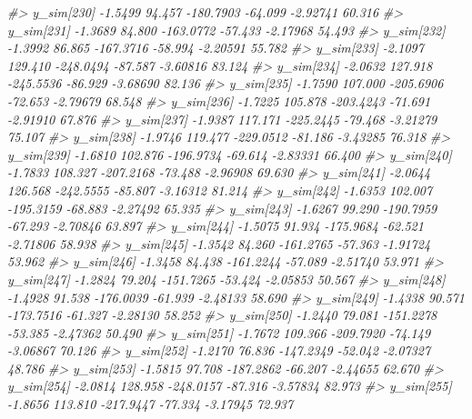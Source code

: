 \documentclass[
  10pt,
  italian,
  a4paper,
  extrafontsizes,onecolumn,openright
  ]{memoir}
\newenvironment{Shaded}{\begin{snugshade}}{\end{snugshade}}
\newcommand{\CommentTok}[1]{\textcolor[rgb]{0.56,0.35,0.01}{\textit{#1}}}
\begin{document}
\begin{Shaded}
\begin{Highlighting}[]
\CommentTok{\#\textgreater{}   y\_sim[230] {-}1.5499  94.457 {-}180.7903 {-}64.099 {-}2.92741 60.316}
\CommentTok{\#\textgreater{}   y\_sim[231] {-}1.3689  84.800 {-}163.0772 {-}57.433 {-}2.17968 54.493}
\CommentTok{\#\textgreater{}   y\_sim[232] {-}1.3992  86.865 {-}167.3716 {-}58.994 {-}2.20591 55.782}
\CommentTok{\#\textgreater{}   y\_sim[233] {-}2.1097 129.410 {-}248.0494 {-}87.587 {-}3.60816 83.124}
\CommentTok{\#\textgreater{}   y\_sim[234] {-}2.0632 127.918 {-}245.5536 {-}86.929 {-}3.68690 82.136}
\CommentTok{\#\textgreater{}   y\_sim[235] {-}1.7590 107.000 {-}205.6906 {-}72.653 {-}2.79679 68.548}
\CommentTok{\#\textgreater{}   y\_sim[236] {-}1.7225 105.878 {-}203.4243 {-}71.691 {-}2.91910 67.876}
\CommentTok{\#\textgreater{}   y\_sim[237] {-}1.9387 117.171 {-}225.2445 {-}79.468 {-}3.21279 75.107}
\CommentTok{\#\textgreater{}   y\_sim[238] {-}1.9746 119.477 {-}229.0512 {-}81.186 {-}3.43285 76.318}
\CommentTok{\#\textgreater{}   y\_sim[239] {-}1.6810 102.876 {-}196.9734 {-}69.614 {-}2.83331 66.400}
\CommentTok{\#\textgreater{}   y\_sim[240] {-}1.7833 108.327 {-}207.2168 {-}73.488 {-}2.96908 69.630}
\CommentTok{\#\textgreater{}   y\_sim[241] {-}2.0644 126.568 {-}242.5555 {-}85.807 {-}3.16312 81.214}
\CommentTok{\#\textgreater{}   y\_sim[242] {-}1.6353 102.007 {-}195.3159 {-}68.883 {-}2.27492 65.335}
\CommentTok{\#\textgreater{}   y\_sim[243] {-}1.6267  99.290 {-}190.7959 {-}67.293 {-}2.70846 63.897}
\CommentTok{\#\textgreater{}   y\_sim[244] {-}1.5075  91.934 {-}175.9684 {-}62.521 {-}2.71806 58.938}
\CommentTok{\#\textgreater{}   y\_sim[245] {-}1.3542  84.260 {-}161.2765 {-}57.363 {-}1.91724 53.962}
\CommentTok{\#\textgreater{}   y\_sim[246] {-}1.3458  84.438 {-}161.2244 {-}57.089 {-}2.51740 53.971}
\CommentTok{\#\textgreater{}   y\_sim[247] {-}1.2824  79.204 {-}151.7265 {-}53.424 {-}2.05853 50.567}
\CommentTok{\#\textgreater{}   y\_sim[248] {-}1.4928  91.538 {-}176.0039 {-}61.939 {-}2.48133 58.690}
\CommentTok{\#\textgreater{}   y\_sim[249] {-}1.4338  90.571 {-}173.7516 {-}61.327 {-}2.28130 58.252}
\CommentTok{\#\textgreater{}   y\_sim[250] {-}1.2440  79.081 {-}151.2278 {-}53.385 {-}2.47362 50.490}
\CommentTok{\#\textgreater{}   y\_sim[251] {-}1.7672 109.366 {-}209.7920 {-}74.149 {-}3.06867 70.126}
\CommentTok{\#\textgreater{}   y\_sim[252] {-}1.2170  76.836 {-}147.2349 {-}52.042 {-}2.07327 48.786}
\CommentTok{\#\textgreater{}   y\_sim[253] {-}1.5815  97.708 {-}187.2862 {-}66.207 {-}2.44655 62.670}
\CommentTok{\#\textgreater{}   y\_sim[254] {-}2.0814 128.958 {-}248.0157 {-}87.316 {-}3.57834 82.973}
\CommentTok{\#\textgreater{}   y\_sim[255] {-}1.8656 113.810 {-}217.9447 {-}77.334 {-}3.17945 72.937}

\end{Highlighting}
\end{Shaded}
\end{document}
